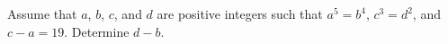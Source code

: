 Assume that $a$, $b$, $c$, and $d$ are positive integers such that $a^5 = b^4$, $c^3 = d^2$, and $c - a = 19$.  Determine $d - b$.